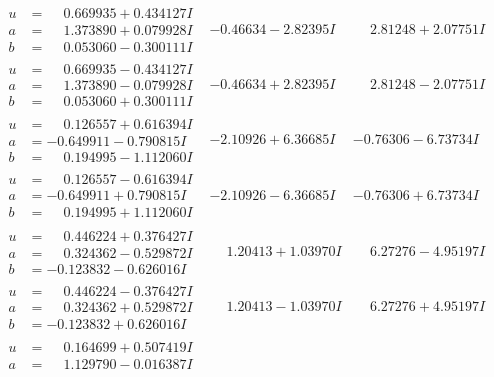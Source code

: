 \documentclass[1p]{elsarticle_modified}
\theoremstyle{definition}
\begin{document}
$$\begin{array}{c|c|c}
\begin{aligned}
u &= \phantom{-}0.669935 + 0.434127 I \\
a &= \phantom{-}1.373890 + 0.079928 I \\
b &= \phantom{-}0.053060 - 0.300111 I\end{aligned}
 & -0.46634 - 2.82395 I & \phantom{-}2.81248 + 2.07751 I \\ \hline\begin{aligned}
u &= \phantom{-}0.669935 - 0.434127 I \\
a &= \phantom{-}1.373890 - 0.079928 I \\
b &= \phantom{-}0.053060 + 0.300111 I\end{aligned}
 & -0.46634 + 2.82395 I & \phantom{-}2.81248 - 2.07751 I \\ \hline\begin{aligned}
u &= \phantom{-}0.126557 + 0.616394 I \\
a &= -0.649911 - 0.790815 I \\
b &= \phantom{-}0.194995 - 1.112060 I\end{aligned}
 & -2.10926 + 6.36685 I & -0.76306 - 6.73734 I \\ \hline\begin{aligned}
u &= \phantom{-}0.126557 - 0.616394 I \\
a &= -0.649911 + 0.790815 I \\
b &= \phantom{-}0.194995 + 1.112060 I\end{aligned}
 & -2.10926 - 6.36685 I & -0.76306 + 6.73734 I \\ \hline\begin{aligned}
u &= \phantom{-}0.446224 + 0.376427 I \\
a &= \phantom{-}0.324362 - 0.529872 I \\
b &= -0.123832 - 0.626016 I\end{aligned}
 & \phantom{-}1.20413 + 1.03970 I & \phantom{-}6.27276 - 4.95197 I \\ \hline\begin{aligned}
u &= \phantom{-}0.446224 - 0.376427 I \\
a &= \phantom{-}0.324362 + 0.529872 I \\
b &= -0.123832 + 0.626016 I\end{aligned}
 & \phantom{-}1.20413 - 1.03970 I & \phantom{-}6.27276 + 4.95197 I \\ \hline\begin{aligned}
u &= \phantom{-}0.164699 + 0.507419 I \\
a &= \phantom{-}1.129790 - 0.016387 I \\

\end{aligned}
\end{array}$$
\end{document}
